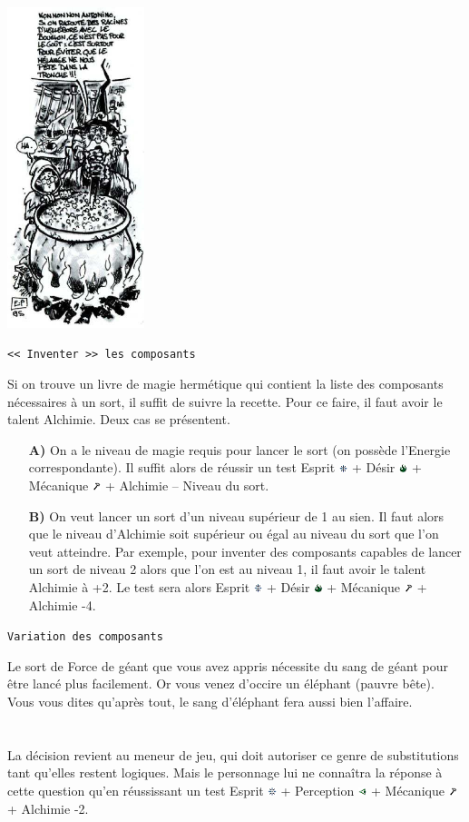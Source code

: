 \documentclass[11pt,twoside,a4paper]{article}
\def\imgESPRI{\includegraphics[width=0.25cm]{../../../../../imgGraphics/rolePlayingGame/SimulacreS/mini12x12/esprit.png} }
\def\imgPERCE{\includegraphics[width=0.25cm]{../../../../../imgGraphics/rolePlayingGame/SimulacreS/mini12x12/perception.png} }
\def\imgDESIR{\includegraphics[width=0.25cm]{../../../../../imgGraphics/rolePlayingGame/SimulacreS/mini12x12/desir.png} }
\def\imgMECAN{\includegraphics[width=0.25cm]{../../../../../imgGraphics/rolePlayingGame/SimulacreS/mini12x12/mecanique.png} }
\begin{document}
\begin{multicols*}{3}
{\includegraphics[width=0.30\textwidth]{img/marmiteMaitreApprenti.jpg}

\texttt{<< Inventer >> les composants}

Si on trouve un livre de magie herm{\'e}tique qui contient la liste des composants n{\'e}cessaires {\`a} un sort, il suffit de suivre la recette. Pour ce faire, il faut avoir le talent Alchimie. Deux cas se pr{\'e}sentent.~\\
\begin{itemize}
	\item[\textbf{A)}] On a le niveau de magie requis pour lancer le sort (on poss{\`e}de l'Energie correspondante). Il suffit alors de r{\'e}ussir un test Esprit \imgESPRI + D{\'e}sir \imgDESIR + M{\'e}canique \imgMECAN + Alchimie -- Niveau du sort.
	\item[\textbf{B)}] On veut lancer un sort d'un niveau sup{\'e}rieur de 1 au sien. Il faut alors que le niveau d'Alchimie soit sup{\'e}rieur ou {\'e}gal au niveau du sort que l'on veut atteindre. Par exemple, pour inventer des composants capables de lancer un sort de niveau 2 alors que l'on est au niveau 1, il faut avoir le talent Alchimie {\`a} +2. Le test sera alors Esprit \imgESPRI + D{\'e}sir \imgDESIR + M{\'e}canique \imgMECAN + Alchimie -4.
\end{itemize}

\texttt{Variation des composants}

Le sort de Force de g{\'e}ant que vous avez appris n{\'e}cessite du sang de g{\'e}ant pour {\^e}tre lanc{\'e} plus facilement. Or vous venez d'occire un {\'e}l{\'e}phant (pauvre b{\^e}te). Vous vous dites qu'apr{\`e}s tout, le sang d'{\'e}l{\'e}phant fera aussi bien l'affaire.~\\
~\\~\\
La d{\'e}cision revient au meneur de jeu, qui doit autoriser ce genre de substitutions tant qu'elles restent logiques. Mais le personnage lui ne conna{\^i}tra la r{\'e}ponse {\`a} cette question qu'en r{\'e}ussissant un test Esprit \imgESPRI + Perception \imgPERCE + M{\'e}canique \imgMECAN + Alchimie -2.~\\

}
\end{multicols*}
\end{document}
